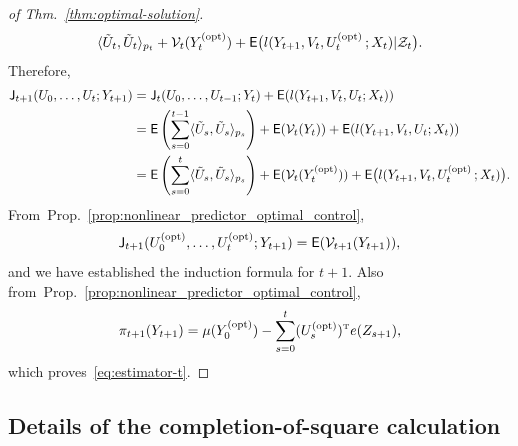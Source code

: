 \documentclass[twoside,11pt]{article}
\def\clZ{{\cal Z}}
\def\E{{\sf E}}
\def\clZ{{\cal Z}}
\def\E{{\sf E}}
\def\Thm#1{Thm.~\ref{#1}}
\def\Prop#1{Prop.~\ref{#1}}
\def\clZ{{\cal Z}}
\def\clV{{\cal V}}
\def\clZ{{\cal Z}}
\def\E{{\sf E}}
\def\sJ{{\sf J}}
\def\tp{{\hbox{\rm\tiny T}}}
\def\opt{{\text{\rm (opt)}}}
\begin{document}
\begin{proof}[of  \Thm{thm:optimal-solution}]
\begin{align*}
  \langle \tilde{U}_t,\tilde{U}_t \rangle_{p_t} + \clV_t(Y_t^\opt) + \E \big( l (Y_{t+1},V_t,U_t^\opt\,;X_t)|\clZ_t\big).
\end{align*}
Therefore,
\begin{align*}
\sJ_{t+1}(U_0,\hdots,U_{t};Y_{t+1}) &=
                                      \sJ_{t}(U_0,\hdots,U_{t-1};Y_{t}) + \E (l(Y_{t+1},V_t,U_t;X_t) )\\
  &= \E \left( \sum_{s=0}^{t-1}
 \langle \tilde{U}_s,\tilde{U}_s \rangle_{p_s}  \right) + \E ( \clV_t(Y_t)) + \E
    (l(Y_{t+1},V_t,U_t;X_t) )\\
  &= \E \left( \sum_{s=0}^{t}
 \langle \tilde{U}_s,\tilde{U}_s \rangle_{p_s} \right) + \E(\clV_t(Y_t^\opt)) + \E \big( l
    (Y_{t+1},V_t,U_t^\opt\,;X_t) \big).
\end{align*}
From~\Prop{prop:nonlinear_predictor_optimal_control}, 
\begin{equation*}
\sJ_{t+1}(U_0^\opt,\hdots,U_t^\opt;Y_{t+1})  = \E(\clV_{t+1}(Y_{t+1})),
\end{equation*}
and we have established the induction formula for $t+1$.  Also
from~\Prop{prop:nonlinear_predictor_optimal_control},
\begin{equation*}
\pi_{t+1}(Y_{t+1}) = \mu (Y_0^\opt) -
                   \sum_{s=0}^{t} (U_s^\opt)^\tp e(Z_{s+1}),
                 \end{equation*}
                 which proves~\eqref{eq:estimator-t}.
\end{proof}

\subsection{Details of the completion-of-square calculation}
\label{sec:calc_for_extra}
\end{document}
